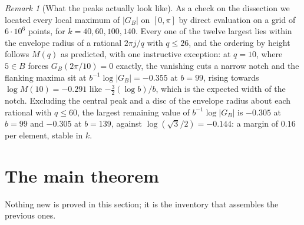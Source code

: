 \documentclass[11pt,a4paper]{article}
\theoremstyle{plain}
\theoremstyle{definition}
\theoremstyle{remark}
\newtheorem{remark}[theorem]{Remark}
\begin{document}
\begin{remark}[What the peaks actually look like]\label{rem:peakscan}
As a check on the dissection we located every local maximum of $|G_B|$ on
$[0,\pi]$ by direct evaluation on a grid of $6\cdot10^{6}$ points, for
$k=40,60,100,140$. Every one of the twelve largest lies within the envelope
radius of a rational $2\pi j/q$ with $q\le26$, and the ordering by height
follows $M(q)$ as predicted, with one instructive exception: at $q=10$, where
$5\in B$ forces $G_B(2\pi/10)=0$ exactly, the vanishing cuts a narrow notch and
the flanking maxima sit at $b^{-1}\log|G_B|=-0.355$ at $b=99$, rising towards
$\log M(10)=-0.291$ like $-\tfrac32(\log b)/b$, which is the expected width of
the notch. Excluding the central peak and a disc of the envelope radius about
each rational with $q\le60$, the largest remaining value of
$b^{-1}\log|G_B|$ is $-0.305$ at $b=99$ and $-0.305$ at $b=139$, against
$\log(\sqrt3/2)=-0.144$: a margin of $0.16$ per element, stable in $k$.
\end{remark}

\section{The main theorem}\label{sec:t2main}

Nothing new is proved in this section; it is the inventory that assembles the
previous ones.
\end{document}
